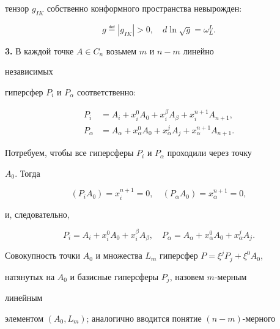 тензор $g_{IK}$ собственно конформного пространства невырожден: 


\begin{equation} 


g\eqdef|g_{IK}|>0,\quad 


d\ln\sqrt{g}=\omega^L_L. 


\end{equation} 


 


{\bf 3.} В каждой точке $A\in C_n$ возьмем $m$ и $n-m$ линейно 


независимых 


гиперсфер $P_i$ и $P_\alpha$ соответственно: 


\begin{align*} 


P_i&=A_i+x^0_i A_0+x^\beta_i A_\beta+x^{n+1}_i A_{n+1},\\ 


P_\alpha&=A_\alpha+x^0_\alpha A_0+ 


x^j_\alpha A_j+x^{n+1}_\alpha A_{n+1}. 


\end{align*} 


Потребуем, чтобы все гиперсферы $P_i$ и $P_\alpha$ проходили через точку 


$A_0$. Тогда 


$$ 


(P_i A_0)=x^{n+1}_i=0,\quad 


(P_\alpha A_0)=x^{n+1}_\alpha=0, 


$$ 


и, следовательно, 


\begin{equation} 


P_i=A_i+x^0_i A_0+x^\beta_i A_\beta,\quad 


P_\alpha=A_\alpha+x^0_\alpha A_0+x^j_\alpha A_j.


\end{equation} 


 


Совокупность точки $A_0$ и множества $L_m$ гиперсфер $P=\xi^j 


P_j+\xi^0A_0$, 


натянутых на $A_0$ и базисные гиперсферы $P_j$, назовем $m$-мерным 


линейным 


элементом $(A_0,L_m)$; аналогично вводится понятие $(n-m)$-мерного 


